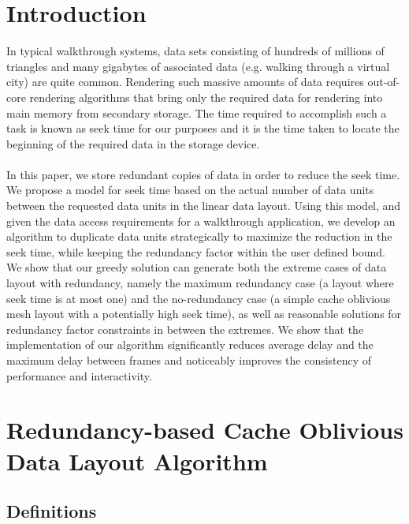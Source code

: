 
\section{Introduction}

In typical walkthrough systems, data sets consisting of hundreds of millions of
triangles and many gigabytes of associated data (e.g. walking through a virtual
city) are quite common. Rendering such massive amounts of data requires
out-of-core rendering algorithms that bring only the required data for
rendering into main memory from secondary storage. The time required to accomplish such a task
is known as seek time for our purposes and it
is the time taken to locate the beginning of the required data in the storage
device. \\
\\
In this paper, we store redundant
copies of data in order to reduce the seek time. We propose a model for seek time based on the actual
number of data units
between the requested data units in the linear data layout. Using this model, and given
the data access requirements for a walkthrough application, we develop
an algorithm to duplicate data units strategically to maximize the reduction
in the seek time, while keeping the redundancy factor within the user defined
bound. We show that our greedy solution can generate both the extreme cases
of data layout with redundancy, namely the maximum redundancy case
(a layout where seek time is at most one) and the no-redundancy case (a simple
cache oblivious mesh layout with a potentially high seek time), as well as
reasonable solutions for redundancy factor constraints in between the extremes.
We show that the
implementation of our algorithm significantly reduces average delay and the maximum delay between
frames and noticeably improves the consistency of performance and
interactivity.

\section{Redundancy-based Cache Oblivious Data Layout Algorithm}

\subsection{Definitions}

